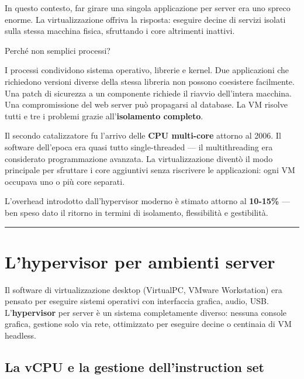 \documentclass[
  italian,
  openany]{book}
\begin{document}
In questo contesto, far girare una singola applicazione per server era
uno spreco enorme. La virtualizzazione offriva la risposta: eseguire
decine di servizi isolati sulla stessa macchina fisica, sfruttando i
core altrimenti inattivi.

\begin{callouttip}{Perché non semplici processi?}

I processi condividono sistema operativo, librerie e kernel. Due
applicazioni che richiedono versioni diverse della stessa libreria non
possono coesistere facilmente. Una patch di sicurezza a un componente
richiede il riavvio dell'intera macchina. Una compromissione del web
server può propagarsi al database. La VM risolve tutti e tre i problemi
grazie all'\textbf{isolamento completo}.

\end{callouttip}

Il secondo catalizzatore fu l'arrivo delle \textbf{CPU multi-core}
attorno al 2006. Il software dell'epoca era quasi tutto single-threaded
--- il multithreading era considerato programmazione avanzata. La
virtualizzazione diventò il modo principale per sfruttare i core
aggiuntivi senza riscrivere le applicazioni: ogni VM occupava uno o più
core separati.

L'overhead introdotto dall'hypervisor moderno è stimato attorno al
\textbf{10-15\%} --- ben speso dato il ritorno in termini di isolamento,
flessibilità e gestibilità.

\begin{center}\rule{0.5\linewidth}{0.5pt}\end{center}

\section{L'hypervisor per ambienti
server}\label{lhypervisor-per-ambienti-server}

Il software di virtualizzazione desktop (VirtualPC, VMware Workstation)
era pensato per eseguire sistemi operativi con interfaccia grafica,
audio, USB. L'\textbf{hypervisor} per server è un sistema completamente
diverso: nessuna console grafica, gestione solo via rete, ottimizzato
per eseguire decine o centinaia di VM headless.

\subsection{La vCPU e la gestione dell'instruction
set}\label{la-vcpu-e-la-gestione-dellinstruction-set}
\end{document}
